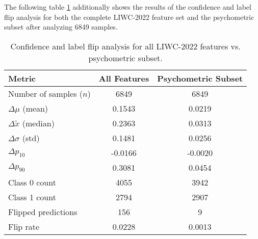 The following table \ref{tab:confidence_label_flip} additionally shows the results of the confidence and label flip analysis for both the complete LIWC-2022 feature set and the psychometric subset after analyzing 6849 samples.

\begin{table}[H]
\centering
\caption{Confidence and label flip analysis for all LIWC-2022 features vs. psychometric subset.}
\begin{tabular}{lcc}
\toprule
\textbf{Metric} & \textbf{All Features} & \textbf{Psychometric Subset} \\
\midrule
Number of samples ($n$)            & 6849    & 6849 \\
$\Delta \mu$ (mean)                & 0.1543  & 0.0219 \\
$\Delta \tilde{x}$ (median)        & 0.2363  & 0.0313 \\
$\Delta \sigma$ (std)              & 0.1481  & 0.0256 \\
$\Delta p_{10}$                    & -0.0166 & -0.0020 \\
$\Delta p_{90}$                    & 0.3081  & 0.0454 \\
Class 0 count                      & 4055    & 3942 \\
Class 1 count                      & 2794    & 2907 \\
Flipped predictions                & 156     & 9 \\
Flip rate                          & 0.0228  & 0.0013 \\
\bottomrule
\end{tabular}
\label{tab:confidence_label_flip}
\end{table}

